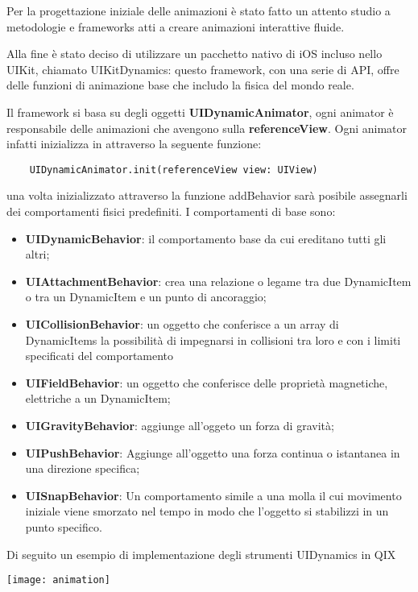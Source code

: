 Per la progettazione iniziale delle animazioni è stato fatto un attento studio a metodologie e frameworks
atti a creare animazioni interattive fluide.

Alla fine è stato deciso di utilizzare un pacchetto
nativo di iOS incluso nello UIKit\cite{uikit}, chiamato UIKitDynamics\cite{uidynamics}: questo framework,
con una serie di API, offre delle funzioni di animazione base che 
includo la fisica del mondo reale.

Il framework si basa su degli oggetti \textbf{UIDynamicAnimator}, ogni animator è responsabile delle
animazioni che avengono sulla \textbf{referenceView}. Ogni animator infatti inizializza
in attraverso la seguente funzione:
\begin{verbatim}
    UIDynamicAnimator.init(referenceView view: UIView)
\end{verbatim}

una volta inizializzato attraverso la funzione addBehavior sarà posibile assegnarli
dei comportamenti fisici predefiniti. I comportamenti di base sono:

\begin{itemize}
    \item\textbf{UIDynamicBehavior}: il comportamento base da cui ereditano tutti gli altri;
    \item\textbf{UIAttachmentBehavior}: crea una relazione o legame tra due DynamicItem o tra un DynamicItem e un punto di ancoraggio;
    \item\textbf{UICollisionBehavior}: un oggetto che conferisce a un array di DynamicItems la possibilità di impegnarsi in collisioni tra loro e con i limiti specificati del comportamento
    \item\textbf{UIFieldBehavior}: un oggetto che conferisce delle proprietà magnetiche, elettriche a un DynamicItem;
    \item\textbf{UIGravityBehavior}: aggiunge all'oggeto un forza di gravità;
    \item\textbf{UIPushBehavior}: Aggiunge all'oggetto una forza continua o istantanea in una direzione specifica;
    \item\textbf{UISnapBehavior}: Un comportamento simile a una molla il cui movimento iniziale viene smorzato nel tempo in modo che l'oggetto si stabilizzi in un punto specifico.
\end{itemize}

Di seguito un esempio di implementazione degli strumenti UIDynamics in QIX

\begin{minipage}{\linewidth}
    \centering
    \texttt{[image: animation]}
    \label{fig:6}
\end{minipage}\\


